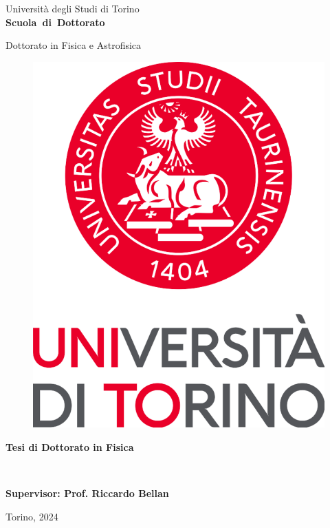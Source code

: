 \thispagestyle{empty}
\begin{center}

\begin{large}
Universit\`a degli Studi di Torino \\
\textbf{Scuola~di~Dottorato}
\end{large}

\hrulefill

\vspace{0.35cm}
\begin{large}
  Dottorato in Fisica e Astrofisica
\end{large}

\vspace{0.5cm}
\begin{figure}[h]
  \centering
  \includegraphics[width=.2\textheight]{Figures/logoUniversita.pdf}
\end{figure}

\vspace{1cm}

\Large{\textbf{Tesi di Dottorato in Fisica}}

\vspace{1cm}

\LARGE{\textbf{\thetitle}}\\

\vspace{1.5cm}

\Large{\textbf{\theauthor}}

\vspace*{\fill}

\large{\textbf{Supervisor: Prof. Riccardo Bellan}}

\vspace{1cm}
\large{Torino, 2024}

\end{center}
